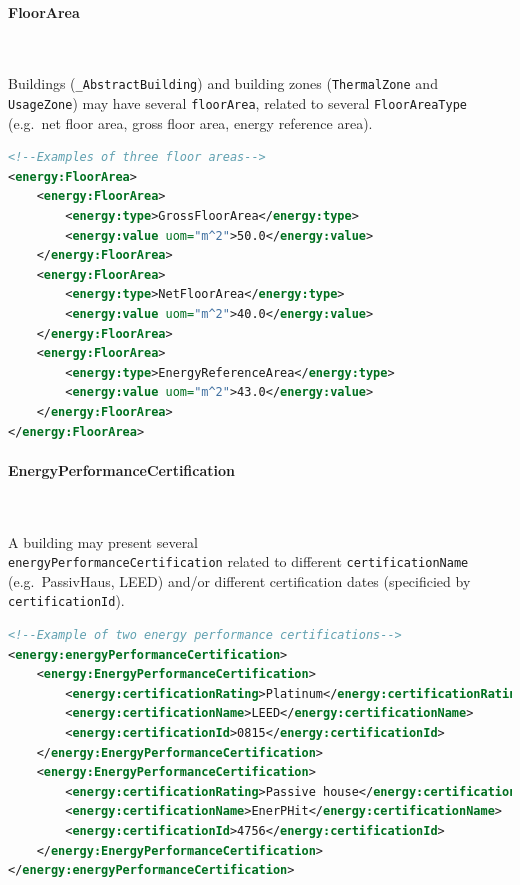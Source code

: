 \documentclass[a4paper,12pt]{article}
\let\stdparagraph\paragraph%
\renewcommand{\paragraph}[1]{\stdparagraph{#1}\mbox{}\\\vspace{-0.5cm}}
\begin{document}
\paragraph{FloorArea}\label{floorarea}

Buildings (\lstinline!_AbstractBuilding!) and building zones
(\lstinline!ThermalZone! and \lstinline!UsageZone!) may have several
\lstinline!floorArea!, related to several \lstinline!FloorAreaType!
(e.g.~net floor area, gross floor area, energy reference area).

\begin{lstlisting}[language=XML]
<!--Examples of three floor areas-->
<energy:FloorArea>
    <energy:FloorArea>
        <energy:type>GrossFloorArea</energy:type>
        <energy:value uom="m^2">50.0</energy:value>
    </energy:FloorArea>
    <energy:FloorArea>
        <energy:type>NetFloorArea</energy:type>
        <energy:value uom="m^2">40.0</energy:value>
    </energy:FloorArea>
    <energy:FloorArea>
        <energy:type>EnergyReferenceArea</energy:type>
        <energy:value uom="m^2">43.0</energy:value>
    </energy:FloorArea>
</energy:FloorArea>
\end{lstlisting}

\paragraph{EnergyPerformanceCertification}\label{energyperformancecertification}

A building may present several\\
\lstinline!energyPerformanceCertification! related to different
\lstinline!certificationName! (e.g.~PassivHaus, LEED) and/or different
certification dates (specificied by \lstinline!certificationId!).

\begin{lstlisting}[language=XML]
<!--Example of two energy performance certifications-->
<energy:energyPerformanceCertification>
    <energy:EnergyPerformanceCertification>
        <energy:certificationRating>Platinum</energy:certificationRating>
        <energy:certificationName>LEED</energy:certificationName>
        <energy:certificationId>0815</energy:certificationId>
    </energy:EnergyPerformanceCertification>
    <energy:EnergyPerformanceCertification>
        <energy:certificationRating>Passive house</energy:certificationRating>
        <energy:certificationName>EnerPHit</energy:certificationName>
        <energy:certificationId>4756</energy:certificationId>
    </energy:EnergyPerformanceCertification>
</energy:energyPerformanceCertification>
\end{lstlisting}
\end{document}
